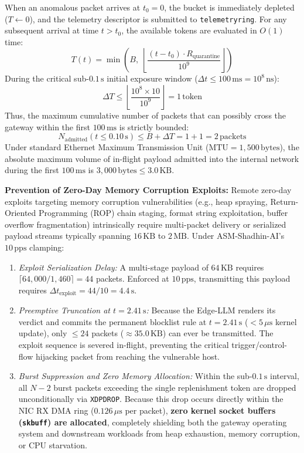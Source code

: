 \documentclass{ieeeaccess}
\renewcommand{\_}{\textunderscore\allowbreak}
\begin{document}
When an anomalous packet arrives at $t_0 = 0$, the bucket is immediately depleted ($T \leftarrow 0$), and the telemetry descriptor is submitted to \texttt{telemetry\_ring}. For any subsequent arrival at time $t > t_0$, the available tokens are evaluated in $O(1)$ time:
\begin{equation}
  T(t) = \min\left(B,\; \left\lfloor \frac{(t - t_0) \cdot R_{\text{quarantine}}}{10^9} \right\rfloor \right)
  \label{eq:token_bucket}
\end{equation}
During the critical sub-$0.1\,\text{s}$ initial exposure window ($\Delta t \le 100\,\text{ms} = 10^8\,\text{ns}$):
\begin{equation}
  \Delta T \le \left\lfloor \frac{10^8 \times 10}{10^9} \right\rfloor = 1\,\text{token}
\end{equation}
Thus, the maximum cumulative number of packets that can possibly cross the gateway within the first $100\,\text{ms}$ is strictly bounded:
\begin{equation}
  N_{\text{admitted}}(t \le 0.10\,\text{s}) \le B + \Delta T = 1 + 1 = 2\,\text{packets}
\end{equation}
Under standard Ethernet Maximum Transmission Unit ($\text{MTU} = 1{,}500\,\text{bytes}$), the absolute maximum volume of in-flight payload admitted into the internal network during the first $100\,\text{ms}$ is $3{,}000\,\text{bytes} \le 3.0\,\text{KB}$.

\textbf{Prevention of Zero-Day Memory Corruption Exploits:}
Remote zero-day exploits targeting memory corruption vulnerabilities (e.g., heap spraying, Return-Oriented Programming (ROP) chain staging, format string exploitation, buffer overflow fragmentation) intrinsically require multi-packet delivery or serialized payload streams typically spanning $16\,\text{KB}$ to $2\,\text{MB}$. Under ASM-Shadhin-AI's $10\,\text{pps}$ clamping:
\begin{enumerate}
  \item \textit{Exploit Serialization Delay:} A multi-stage payload of $64\,\text{KB}$ requires $\lceil 64{,}000 / 1{,}460 \rceil = 44$ packets. Enforced at $10\,\text{pps}$, transmitting this payload requires $\Delta t_{\text{exploit}} = 44 / 10 = 4.4\,\text{s}$.
  \item \textit{Preemptive Truncation at $t = 2.41\,\text{s}$:} Because the Edge-LLM renders its verdict and commits the permanent blocklist rule at $t = 2.41\,\text{s}$ ($< 5\,\mu\text{s}$ kernel update), only $\le 24$ packets ($\approx 35.0\,\text{KB}$) can ever be transmitted. The exploit sequence is severed in-flight, preventing the critical trigger/control-flow hijacking packet from reaching the vulnerable host.
  \item \textit{Burst Suppression and Zero Memory Allocation:} Within the sub-$0.1\,\text{s}$ interval, all $N - 2$ burst packets exceeding the single replenishment token are dropped unconditionally via \texttt{XDP\_DROP}. Because this drop occurs directly within the NIC RX DMA ring ($0.126\,\mu\text{s}$ per packet), \textbf{zero kernel socket buffers (\texttt{sk\_buff}) are allocated}, completely shielding both the gateway operating system and downstream workloads from heap exhaustion, memory corruption, or CPU starvation.
\end{enumerate}
\end{document}
